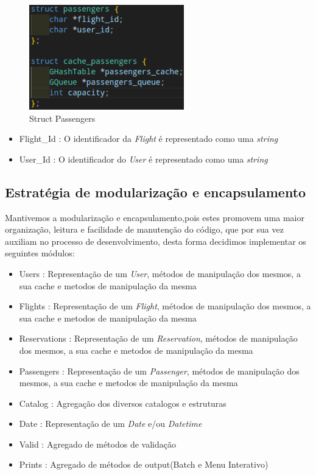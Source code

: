 \documentclass[11pt]{article}
\begin{document}
    \begin{figure}[hbt!]
        \centering
        \includegraphics[width=0.6\textwidth]{Imagens/struct passengers.png}
        \caption{Struct Passengers}
        \label{fig:example}
    \end{figure}
    
    \begin{itemize}
        \item Flight_Id : O identificador da \textit{Flight} é representado como uma \textit{string}
        \item User_Id : O identificador do \textit{User} é representado como uma \textit{string}
    \end{itemize}
\newpage


\subsection{Estratégia de modularização e encapsulamento}

Mantivemos a modularização e encapsulamento,pois estes promovem uma maior organização, leitura e facilidade de manutenção do código, que por sua vez auxiliam no processo de desenvolvimento, desta forma decidimos implementar os seguintes módulos:
    \begin{itemize}
        \item Users : Representação de um \textit{User}, métodos de manipulação dos mesmos, a sua cache e metodos de manipulação da mesma
        \item Flights : Representação de um \textit{Flight}, métodos de manipulação dos mesmos, a sua cache e metodos de manipulação da mesma
        \item Reservations : Representação de um \textit{Reservation}, métodos de manipulação dos mesmos, a sua cache e metodos de manipulação da mesma
        \item Passengers : Representação de um \textit{Passenger}, métodos de manipulação dos mesmos, a sua cache e metodos de manipulação da mesma
        \item Catalog : Agregação dos diversos catalogos e estruturas
        \item Date : Representação de um \textit{Date} e/ou \textit{Datetime}
        \item Valid : Agregado de métodos de validação
        \item Prints : Agregado de métodos de output(Batch e Menu Interativo)
    \end{itemize}
\end{document}
